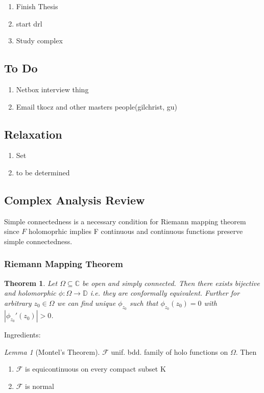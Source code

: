 \documentclass[11pt]{article}
\newtheorem{theorem}{Theorem}
\theoremstyle{remark}
\newtheorem{lemma}{Lemma}
\begin{document}
\begin{enumerate}
	\item Finish Thesis
	\item start drl
	\item Study complex
\end{enumerate}

\subsection{To Do}

\begin{enumerate}
	\item Netbox interview thing
	\item Email tkocz and other masters people(gilchrist, gu)
\end{enumerate}

\subsection{Relaxation}

\begin{enumerate}
	\item Set
	\item to be determined
\end{enumerate}

\subsection{Complex Analysis Review}

Simple connectedness is a necessary condition for Riemann mapping theorem since $F$ holomoprhic implies F continuous and continuous functions preserve simple connectedness.

\subsubsection{Riemann Mapping Theorem}

\begin{theorem}\label{thm:RM}
	Let $\Omega \subseteq \mathbb{C}$ be open and simply connected. Then there exists bijective and holomorphic $\phi : \Omega \to \mathbb{D}$ i.e. they are conformally equivalent. Further for arbitrary $z_0 \in \Omega$ we can find unique $\phi_{z_0}$ such that $\phi_{z_0}(z_0) = 0$ with $|\phi_{z_0}'(z_0)| > 0$. 
\end{theorem}

Ingredients:

\begin{lemma}[Montel's Theorem]
	$\mathcal{F}$ unif. bdd. family of holo functions on $\Omega$. Then
	\begin{enumerate}
		\item $\mathcal{F}$ is equicontinuous on every compact subset K
		\item $\mathcal{F}$ is normal
	\end{enumerate}
\end{lemma}
\end{document}

